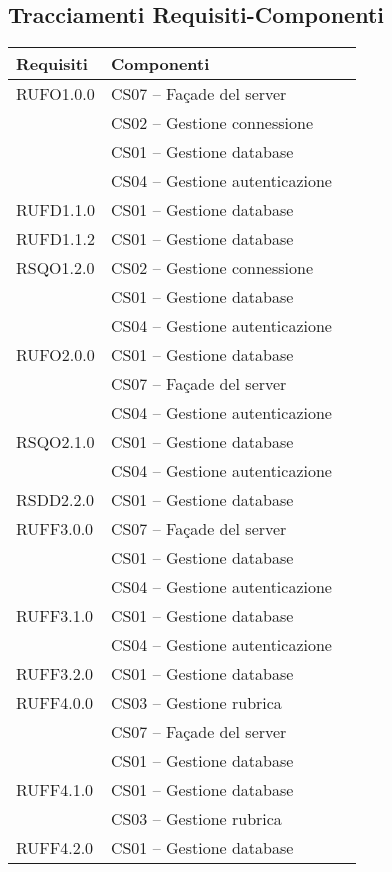 \subsection{Tracciamenti Requisiti-Componenti}\label{sec:tracRecComp}

\begin{center}
\begin{longtable}{lp{}l}
\toprule Requisiti &  Componenti\\
\midrule
RUFO1.0.0 & CS07 -- Façade del server \\
 & CS02 -- Gestione connessione \\
 & CS01 -- Gestione database \\
 & CS04 -- Gestione autenticazione \\
RUFD1.1.0 & CS01 -- Gestione database \\
RUFD1.1.2 & CS01 -- Gestione database \\
RSQO1.2.0 & CS02 -- Gestione connessione \\
 & CS01 -- Gestione database \\
  & CS04 -- Gestione autenticazione \\
RUFO2.0.0 & CS01 -- Gestione database \\
 & CS07 -- Façade del server \\
  & CS04 -- Gestione autenticazione \\
RSQO2.1.0 & CS01 -- Gestione database \\
 & CS04 -- Gestione autenticazione \\
RSDD2.2.0 & CS01 -- Gestione database \\
RUFF3.0.0 & CS07 -- Façade del server \\
 & CS01 -- Gestione database \\
  & CS04 -- Gestione autenticazione \\
RUFF3.1.0 & CS01 -- Gestione database \\
 & CS04 -- Gestione autenticazione \\
RUFF3.2.0 & CS01 -- Gestione database \\
RUFF4.0.0 & CS03 -- Gestione rubrica \\
 & CS07 -- Façade del server \\
 & CS01 -- Gestione database \\
RUFF4.1.0 & CS01 -- Gestione database \\
 & CS03 -- Gestione rubrica \\
RUFF4.2.0 & CS01 -- Gestione database \\

\end{longtable}
\end{center}
